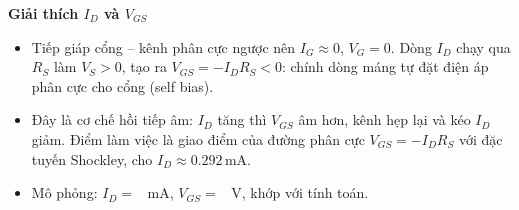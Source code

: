 \par\medskip\noindent\textbf{Giải thích $I_D$ và $V_{GS}$}\par\smallskip
\begin{remarkbox}
\begin{itemize}[nosep]
  \item Tiếp giáp cổng -- kênh phân cực ngược nên $I_G \approx 0$, $V_G = 0$. Dòng $I_D$ chạy qua $R_S$ làm $V_S > 0$, tạo ra $V_{GS} = -I_D R_S < 0$: chính dòng máng tự đặt điện áp phân cực cho cổng (self bias).
  \item Đây là cơ chế hồi tiếp âm: $I_D$ tăng thì $V_{GS}$ âm hơn, kênh hẹp lại và kéo $I_D$ giảm. Điểm làm việc là giao điểm của đường phân cực $V_{GS} = -I_D R_S$ với đặc tuyến Shockley, cho $I_D \approx 0.292\,\text{mA}$.
  \item Mô phỏng: $I_D = $ \fillcell\ mA, $V_{GS} = $ \fillcell\ V, khớp với tính toán.
\end{itemize}
\end{remarkbox}
